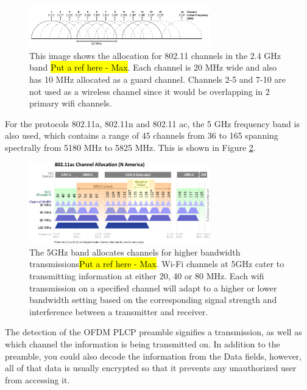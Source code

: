 \begin{figure}[ht]
\centering
\includegraphics[width=0.70\textwidth]{img/2_GHz_Channels.png}
\caption{This image shows the allocation for 802.11 channels in the 2.4 GHz band \hl{Put a ref here - Max}. Each channel is 20 MHz wide and also has 10 MHz allocated as a guard channel. Channels 2-5 and 7-10 are not used as a wireless channel since it would be overlapping in 2 primary wifi channels.}
\label{fig:2.4GHz_channel}
\end{figure} \par
For the protocols 802.11a, 802.11n and 802.11 ac, the 5 GHz frequency band is also used, which contains a range of 45 channels from 36 to 165 spanning spectrally from 5180 MHz to 5825 MHz.  This is shown in Figure \ref{fig:5GHz_channel}.
\begin{figure}[ht]
\centering
\includegraphics[width=0.70\textwidth]{img/5_GHz_Channels.png}
\caption{The 5GHz band allocates channels for higher bandwidth transmissions\hl{Put a ref here - Max}.  Wi-Fi channels at 5GHz cater to transmitting information at either 20, 40 or 80 MHz. Each wifi transmission on a specified channel will adapt to a higher or lower bandwidth setting based on the corresponding signal strength and interference between a transmitter and receiver.}
\label{fig:5GHz_channel}
\end{figure}
The detection of the OFDM PLCP preamble signifies a transmission, as well as which channel the information is being transmitted on. In addition to the preamble, you could also decode the information from the Data fields, however, all of that data is usually encrypted so that it prevents any unauthorized user from accessing it. \cite{wifi_book}

